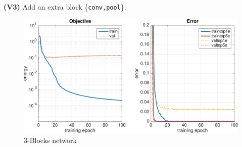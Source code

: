 \documentclass[11pt]{article}
\begin{document}
\textbf{(V3)} Add an extra block \{\texttt{conv,pool}\}:
	\begin{figure}[H]
	    \centering
	    \includegraphics[width=15cm]{v3}
	    \caption{3-Blocks network}
	\end{figure}
\end{document}
